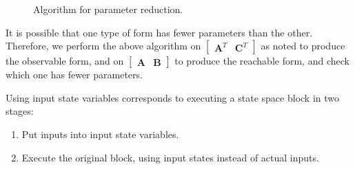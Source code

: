 \begin{figure}[t]







\vspace{-6pt}
\caption{Algorithm for parameter reduction. \protect\label{fig:param}}
\end{figure}

    It is possible that one type of form has fewer parameters than the
other. Therefore, we perform the above algorithm on $\left [
\begin{array} {cc} \mathbf{A}^T & \mathbf{C}^T
\end{array} \right ]$ as noted to produce the observable form, and on $\left [
\begin{array} {cc} \mathbf{A} & \mathbf{B} \end{array} \right
]$ to produce the reachable form, and check which one has fewer
parameters.


Using input state variables corresponds to executing a state space
block in two stages:
\begin{enumerate}
\vspace{\itemshrink} \item Put inputs into input state variables.

\vspace{\itemshrink} \item Execute the original block, using input states instead of
actual inputs.
\vspace{\itemshrink} \end{enumerate}

